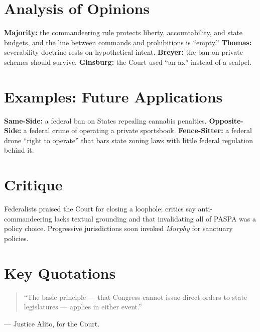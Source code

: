 \documentclass[12pt]{article}
\begin{document}
\section{Analysis of Opinions}
\textbf{Majority:} the commandeering rule protects liberty, accountability, and state budgets, and the line between commands and prohibitions is ``empty.'' \textbf{Thomas:} severability doctrine rests on hypothetical intent. \textbf{Breyer:} the ban on private schemes should survive. \textbf{Ginsburg:} the Court used ``an ax'' instead of a scalpel.

\section{Examples: Future Applications}
\textbf{Same-Side:} a federal ban on States repealing cannabis penalties. \textbf{Opposite-Side:} a federal crime of operating a private sportsbook. \textbf{Fence-Sitter:} a federal drone ``right to operate'' that bars state zoning laws with little federal regulation behind it.

\section{Critique}
Federalists praised the Court for closing a loophole; critics say anti-commandeering lacks textual grounding and that invalidating all of PASPA was a policy choice. Progressive jurisdictions soon invoked \textit{Murphy} for sanctuary policies.

\section{Key Quotations}
\begin{quote}
``The basic principle --- that Congress cannot issue direct orders to state legislatures --- applies in either event.''
\end{quote}
\noindent --- Justice Alito, for the Court.
\end{document}
